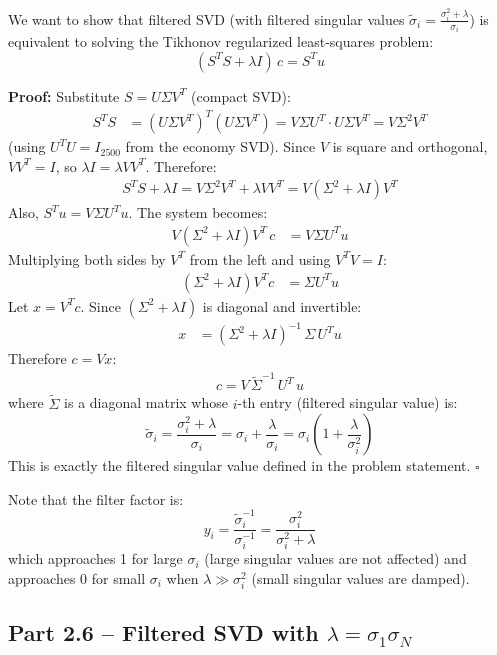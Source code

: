 \documentclass[12pt,a4paper]{article}
\begin{document}
We want to show that filtered SVD (with filtered singular values $\tilde{\sigma}_i = \frac{\sigma_i^2+\lambda}{\sigma_i}$) is equivalent to solving the Tikhonov regularized least-squares problem:
\[
    (S^T S + \lambda I)\,c = S^T u
\]

\textbf{Proof:} Substitute $S = U\Sigma V^T$ (compact SVD):
\begin{align}
    S^T S &= (U\Sigma V^T)^T (U\Sigma V^T) = V\Sigma U^T \cdot U\Sigma V^T = V\Sigma^2 V^T
\end{align}
(using $U^T U = I_{2500}$ from the economy SVD). Since $V$ is square and orthogonal, $VV^T = I$, so $\lambda I = \lambda V V^T$. Therefore:
\begin{align}
    S^T S + \lambda I = V\Sigma^2 V^T + \lambda V V^T = V\!\left(\Sigma^2 + \lambda I\right)\!V^T
\end{align}
Also, $S^T u = V\Sigma U^T u$. The system becomes:
\begin{align}
    V\!\left(\Sigma^2 + \lambda I\right)\!V^T\,c &= V\Sigma U^T u
\end{align}
Multiplying both sides by $V^T$ from the left and using $V^T V = I$:
\begin{align}
    \left(\Sigma^2 + \lambda I\right) V^T c &= \Sigma U^T u
\end{align}
Let $x = V^T c$. Since $(\Sigma^2 + \lambda I)$ is diagonal and invertible:
\begin{align}
    x &= (\Sigma^2 + \lambda I)^{-1}\,\Sigma\,U^T u
\end{align}
Therefore $c = Vx$:
\begin{align}
    \boxed{c = V\,\tilde{\Sigma}^{-1}\,U^T\,u}
\end{align}
where $\tilde{\Sigma}$ is a diagonal matrix whose $i$-th entry (filtered singular value) is:
\[
    \tilde{\sigma}_i = \frac{\sigma_i^2 + \lambda}{\sigma_i}
    = \sigma_i + \frac{\lambda}{\sigma_i}
    = \sigma_i\!\left(1 + \frac{\lambda}{\sigma_i^2}\right)
\]
This is exactly the filtered singular value defined in the problem statement. \hfill$\square$

Note that the filter factor is:
\[
    y_i = \frac{\tilde{\sigma}_i^{-1}}{\sigma_i^{-1}} = \frac{\sigma_i^2}{\sigma_i^2 + \lambda}
\]
which approaches 1 for large $\sigma_i$ (large singular values are not affected) and approaches 0 for small $\sigma_i$ when $\lambda \gg \sigma_i^2$ (small singular values are damped).

\subsection{Part 2.6 -- Filtered SVD with $\lambda = \sigma_1 \sigma_N$}
\end{document}
